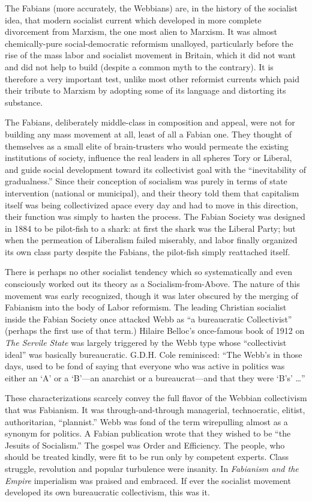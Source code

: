 The Fabians (more accurately, the Webbians) are, in the history of the socialist idea, that modern socialist current which developed in more complete divorcement from Marxism, the one most alien to Marxism. It was almost chemically-pure social-democratic reformism unalloyed, particularly before the rise of the mass labor and socialist movement in Britain, which it did not want and did not help to build (despite a common myth to the contrary). It is therefore a very important test, unlike most other reformist currents which paid their tribute to Marxism by adopting some of its language and distorting its substance.

The Fabians, deliberately middle-class in composition and appeal, were not for building any mass movement at all, least of all a Fabian one. They thought of themselves as a small elite of brain-trusters who would permeate the existing institutions of society, influence the real leaders in all spheres Tory or Liberal, and guide social development toward its collectivist goal with the ``inevitability of gradualness.'' Since their conception of socialism was purely in terms of state intervention (national or municipal), and their theory told them that capitalism itself was being collectivized apace every day and had to move in this direction, their function was simply to hasten the process. The Fabian Society was designed in 1884 to be pilot-fish to a shark: at first the shark was the Liberal Party; but when the permeation of Liberalism failed miserably, and labor finally organized its own class party despite the Fabians, the pilot-fish simply reattached itself.

There is perhaps no other socialist tendency which so systematically and even consciously worked out its theory as a Socialism-from-Above. The nature of this movement was early recognized, though it was later obscured by the merging of Fabianism into the body of Labor reformism. The leading Christian socialist inside the Fabian Society once attacked Webb as ``a bureaucratic Collectivist'' (perhaps the first use of that term.) Hilaire Belloc's once-famous book of 1912 on \emph{The Servile State} was largely triggered by the Webb type whose ``collectivist ideal'' was basically bureaucratic. G.D.H. Cole reminisced: ``The Webb's in those days, used to be fond of saying that everyone who was active in politics was either an `A' or a `B'---an anarchist or a bureaucrat---and that they were `B's' \ldots''

These characterizations scarcely convey the full flavor of the Webbian collectivism that was Fabianism. It was through-and-through managerial, technocratic, elitist, authoritarian, ``plannist.'' Webb was fond of the term wirepulling almost as a synonym for politics. A Fabian publication wrote that they wished to be ``the Jesuits of Socialism.'' The gospel was Order and Efficiency. The people, who should be treated kindly, were fit to be run only by competent experts. Class struggle, revolution and popular turbulence were insanity. In \emph{Fabianism and the Empire} imperialism was praised and embraced. If ever the socialist movement developed its own bureaucratic collectivism, this was it.

